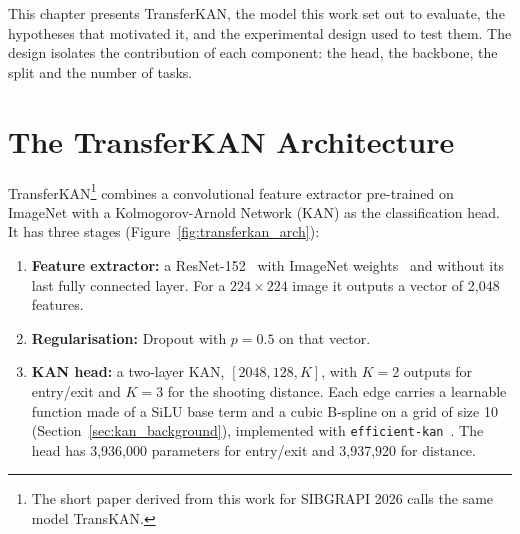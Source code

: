 \label{chap:solution}

This chapter presents TransferKAN, the model this work set out to evaluate, the hypotheses that motivated it, and the experimental design used to test them. The design isolates the contribution of each component: the head, the backbone, the split and the number of tasks.

\section{The TransferKAN Architecture}
\label{sec:transferkan_arch}

TransferKAN\footnote{The short paper derived from this work for SIBGRAPI 2026 calls the same model TransKAN.} combines a convolutional feature extractor pre-trained on ImageNet with a Kolmogorov-Arnold Network (KAN) as the classification head. It has three stages (Figure~\ref{fig:transferkan_arch}):
\begin{enumerate}
    \item \textbf{Feature extractor:} a ResNet-152~\cite{he2016resnet} with ImageNet weights~\cite{deng2009imagenet} and without its last fully connected layer. For a $224 \times 224$ image it outputs a vector of 2,048 features.
    \item \textbf{Regularisation:} Dropout with $p=0.5$ on that vector.
    \item \textbf{KAN head:} a two-layer KAN, $[2048, 128, K]$, with $K=2$ outputs for entry/exit and $K=3$ for the shooting distance. Each edge carries a learnable function made of a SiLU base term and a cubic B-spline on a grid of size 10 (Section~\ref{sec:kan_background}), implemented with \texttt{efficient-kan}~\cite{efficientkan}. The head has 3,936,000 parameters for entry/exit and 3,937,920 for distance.
\end{enumerate}

